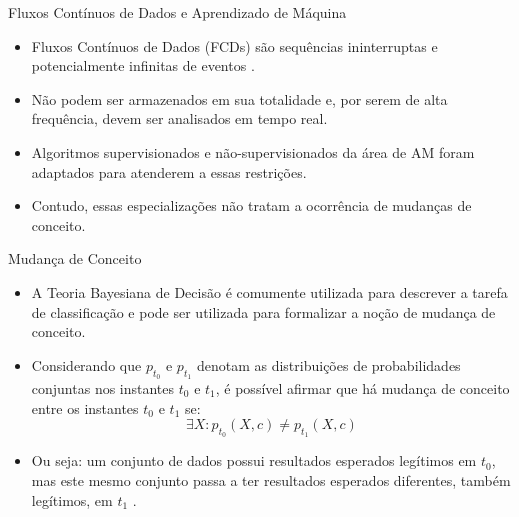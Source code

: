 \documentclass[10pt]{beamer}
\begin{document}
\begin{frame}{Fluxos Contínuos de Dados e Aprendizado de Máquina}
    \begin{itemize}
        \item<1 -> \alert{Fluxos Contínuos de Dados (FCDs)} são sequências ininterruptas e potencialmente infinitas de eventos \cite{Aggarwal:2006:DSM:1196418}.
        \item<1 -> Não podem ser armazenados em sua totalidade e, por serem de alta frequência, devem ser analisados em tempo real.
        \item<1 -> Algoritmos supervisionados \cite{Domingos:2000:MHD:347090.347107, Bifet:2013:EDS:2480362.2480516, Wang:2003:MCD:956750.956778, Aggarwal:2004:DCD:1014052.1014110, Gama:2003:ADT:956750.956813} e não-supervisionados \cite{Aggarwal:2003:FCE:1315451.1315460, Ackermann:2012:SCA:2133803.2184450, Kranen:2011:CIM:2134350.2134352} da área de AM foram adaptados para atenderem a essas restrições.
        \item<1 -> Contudo, essas especializações não tratam a ocorrência de \alert{mudanças de conceito}.
      \end{itemize}
\end{frame}

\begin{frame}{Mudança de Conceito}
    \begin{itemize}
        \item<1 -> A Teoria Bayesiana de Decisão \cite{Duda:2000:PC:954544} é comumente utilizada para descrever a tarefa de classificação e pode ser utilizada para formalizar a noção de \alert{mudança de conceito}.
        \item<1 -> Considerando que $p_{t_0}$ e $p_{t_1}$ denotam as distribuições de probabilidades conjuntas nos instantes $t_0$ e $t_1$, é possível afirmar que há mudança de conceito entre os instantes $t_0$ e $t_1$ se:
        \begin{equation} \label{eq:3}
            {\exists}X : p_{t_0}(X, c) \ne p_{t_1}(X, c)
        \end{equation}
        \item<1 -> Ou seja: um conjunto de dados possui resultados esperados legítimos em $t_0$, mas este mesmo conjunto passa a ter resultados esperados diferentes, também legítimos, em $t_1$ \cite{Kolter:2007:DWM:1314498.1390333}.
    \end{itemize}
\end{frame}
\end{document}
